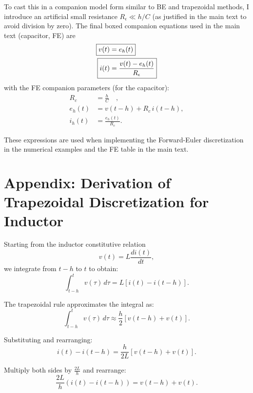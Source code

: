To cast this in a companion model form similar to BE and trapezoidal methods, I introduce an artificial small resistance $R_\epsilon \ll h/C$ (as justified in the main text to avoid division by zero). The final boxed companion equations used in the main text (capacitor, FE) are
\begin{align}
    \Aboxed{v(t) &= e_h(t)} \label{eq:vt_cap_fe_app} \\
    \Aboxed{i(t) &= \frac{v(t) - e_h(t)}{R_\epsilon}} \label{eq:it_cap_fe_app}
\end{align}
with the FE companion parameters (for the capacitor):
\begin{align}
    R_c &= \frac{h}{C} \quad, \\
    e_h(t) &= v(t-h) + R_c\, i(t-h), \\
    i_h(t) &= \frac{e_h(t)}{R_c}.
\end{align}

These expressions are used when implementing the Forward-Euler discretization in the numerical examples and the FE table in the main text.

\clearpage
\section{Appendix: Derivation of Trapezoidal Discretization for Inductor} \label{sec:appendix_ind_trapz}

Starting from the inductor constitutive relation
\begin{equation}
    v(t) = L\frac{di(t)}{dt},
\end{equation}
we integrate from $t-h$ to $t$ to obtain:
\begin{equation}
    \int_{t-h}^{t} v(\tau) \, d\tau = L \left[ i(t) - i(t-h) \right].
\end{equation}

The trapezoidal rule approximates the integral as:
\begin{equation}
    \int_{t-h}^{t} v(\tau) \, d\tau \approx \frac{h}{2} \left[ v(t-h) + v(t) \right].
\end{equation}

Substituting and rearranging:
\begin{equation}
    i(t) - i(t-h) = \frac{h}{2L} \left[ v(t-h) + v(t) \right].
\end{equation}

Multiply both sides by $\frac{2L}{h}$ and rearrange:
\begin{equation}
    \frac{2L}{h} \left( i(t) - i(t-h) \right) = v(t-h) + v(t).
\end{equation}

